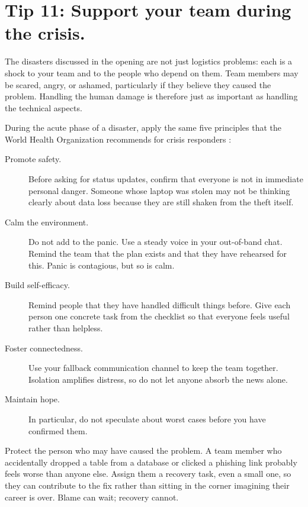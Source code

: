 \documentclass[10pt,letterpaper]{article}
\begin{document}
\section*{Tip 11: Support your team during the crisis.}

The disasters discussed in the opening are not just logistics problems: each is
a shock to your team and to the people who depend on them.  Team members may be
scared, angry, or ashamed, particularly if they believe they caused the problem.
Handling the human damage is therefore just as important as handling the
technical aspects.

During the acute phase of a disaster, apply the same five principles that the
World Health Organization recommends for crisis responders \cite{who2026}:

\begin{description}
  
\item[Promote safety.]
  Before asking for status updates, confirm that everyone is not in immediate
  personal danger.  Someone whose laptop was stolen may not be thinking clearly
  about data loss because they are still shaken from the theft itself.
  
\item[Calm the environment.]
  Do not add to the panic.  Use a steady voice in your out-of-band chat.  Remind
  the team that the plan exists and that they have rehearsed for this.  Panic is
  contagious, but so is calm.
  
\item[Build self-efficacy.]
  Remind people that they have handled difficult things before.  Give each person
  one concrete task from the checklist so that everyone feels useful rather than
  helpless.
  
\item[Foster connectedness.]
  Use your fallback communication channel to keep the team together.  Isolation
  amplifies distress, so do not let anyone absorb the news alone.
  
\item[Maintain hope.]
  In particular, do not speculate about worst cases before you have confirmed
  them.
  
\end{description}

Protect the person who may have caused the problem.  A team member who
accidentally dropped a table from a database or clicked a phishing link probably
feels worse than anyone else.  Assign them a recovery task, even a small one, so
they can contribute to the fix rather than sitting in the corner imagining their
career is over.  Blame can wait; recovery cannot.
\end{document}
